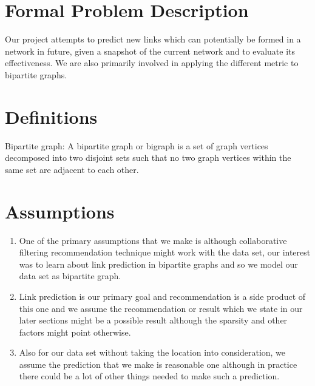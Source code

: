 \documentclass[letterpaper,twocolumn,11pt]{article}
\begin{document}



\section{Formal Problem Description}

Our project attempts to predict new links which can potentially be formed in a network in future, given a snapshot of the current network and to evaluate its effectiveness. We are also primarily involved in applying the different metric to bipartite graphs.


\section{Definitions}
Bipartite graph: A bipartite graph or bigraph is a set of graph vertices decomposed into two disjoint sets such that no two graph vertices within the same set are adjacent to each other.

\section{Assumptions}
\label{sec:assumptions}
\begin{enumerate}
\item One of the primary assumptions that we make is although collaborative filtering recommendation technique might work with the data set, our interest was to learn about link prediction in bipartite graphs and so we model our data set as bipartite graph.
\item Link prediction is our primary goal and recommendation is a side product of this one and we assume the recommendation or result which we state in our later sections might be a possible result although the sparsity and other factors might point otherwise.
\item Also for our data set without taking the location into consideration, we assume the prediction that we make is reasonable one although in practice there could be a lot of other things needed to make such a prediction.
\end{enumerate}
\end{document}
